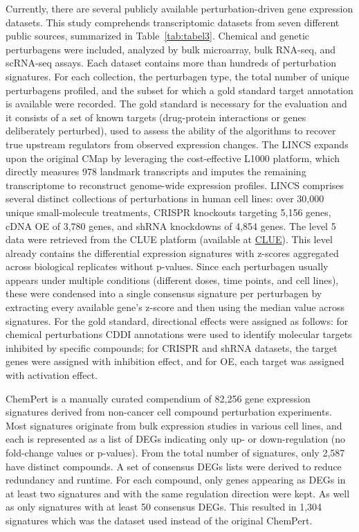 Currently, there are several publicly available perturbation-driven gene expression datasets. This study comprehends transcriptomic datasets from seven different public sources, summarized in Table~\ref{tab:tabel3}. Chemical and genetic perturbagens were included, analyzed by bulk microarray, bulk \gls{RNA-seq}, and \gls{scRNA-seq} assays. Each dataset contains more than hundreds of perturbation signatures. For each collection, the perturbagen type, the total number of unique perturbagens profiled, and the subset for which a gold standard target annotation is available were recorded. The gold standard is necessary for the evaluation and it consists of a set of known targets (drug-protein interactions or genes deliberately perturbed), used to assess the ability of the algorithms to recover true upstream regulators from observed expression changes. 
The \gls{LINCS} expands upon the original \gls{CMap} by leveraging the cost-effective L1000 platform, which directly measures 978 landmark transcripts and imputes the remaining transcriptome to reconstruct genome-wide expression profiles. \gls{LINCS} comprises several distinct collections of perturbations in human cell lines: over 30,000 unique small-molecule treatments, \gls{CRISPR} knockouts targeting 5,156 genes, c\gls{DNA} \gls{OE} of 3,780 genes, and shRNA knockdowns of 4,854 genes. The level 5 data were retrieved from the CLUE platform (available at \href{https://clue.io/data/CMap2020#LINCS2020}{CLUE}). This level already contains the differential expression signatures with z-scores aggregated across biological replicates without p-values.
Since each perturbagen usually appears under multiple conditions (different doses, time points, and cell lines), these were condensed into a single consensus signature per perturbagen by extracting every available gene's z-score and then using the median value across signatures.
For the gold standard, directional effects were assigned as follows: for chemical perturbations \gls{CDDI} annotations were used to identify molecular targets inhibited by specific compounds; for \gls{CRISPR} and \gls{shRNA} datasets, the target genes were assigned with inhibition effect, and for \gls{OE}, each target was assigned with activation effect.

ChemPert is a manually curated compendium of 82,256 gene expression signatures derived from non-cancer cell compound perturbation experiments. Most signatures originate from bulk expression studies in various cell lines, and each is represented as a list of \gls{DEGs} indicating only up- or down-regulation (no fold-change values or p-values). From the total number of signatures, only 2,587 have distinct compounds. A set of consensus \gls{DEGs} lists were derived to reduce redundancy and runtime. For each compound, only genes appearing as \gls{DEGs} in at least two signatures and with the same regulation direction were kept. As well as only signatures with at least 50 consensus \gls{DEGs}. This resulted in 1,304 signatures which was the dataset used instead of the original ChemPert.

